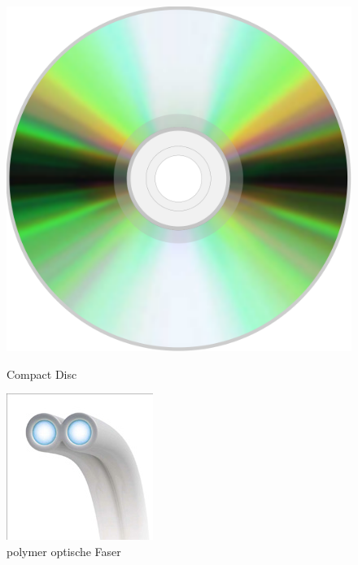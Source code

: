 \begin{figure}[h]
    \begin{center}
        \begin{minipage}[t]{0.3\textwidth}
            \begin{center}
                \includegraphics[height=0.1\textheight]{Bilder/Einleitung/compact-disk.png}
                \caption[Compact Disc \newline \url{https://en.wikipedia.org/wiki/File:Compact_disc.svg} (zuletzt aufgerufen am 19.09.2015)]{Compact Disc}
                \label{fig:compact-disc}
            \end{center}
        \end{minipage}
        \hspace{0.025\textwidth}
        \begin{minipage}[t]{0.3\textwidth}
            \begin{center}
                \includegraphics[height=0.1\textheight]{Bilder/Einleitung/pof.png}
                \caption[polymer optische Faser \newline \url{http://www.heise.de/tr/imgs/08/2/5/4/2/1/5/c337ef89957e0f2b.jpg} (zuletzt aufgerufen am 19.09.2015)]{polymer optische Faser}
                \label{fig:pof}
            \end{center}
        \end{minipage}
    \end{center}
\end{figure}
